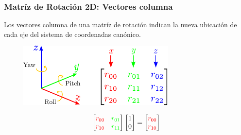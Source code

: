 \begin{frame}
    \frametitle{Matríz de Rotación 2D: Vectores columna}

    Los vectores columna de una matríz de rotación indican la nueva ubicación de cada eje del sistema de coordenadas canónico.

    \begin{figure}[!h]
        \includegraphics[width=0.5\columnwidth]{./images/rotation_matrix_column_vectors.pdf}
    \end{figure}

    \begin{equation*}
        \begin{bmatrix}
            \textcolor{red}{r_{00}} & \textcolor{green}{r_{01}}\\
            \textcolor{red}{r_{10}} & \textcolor{green}{r_{11}}
        \end{bmatrix}
        \begin{bmatrix}
            1\\
            0
        \end{bmatrix} =
        \begin{bmatrix}
            \textcolor{red}{r_{00}}\\
            \textcolor{red}{r_{10}}
        \end{bmatrix}
    \end{equation*}

\end{frame}

